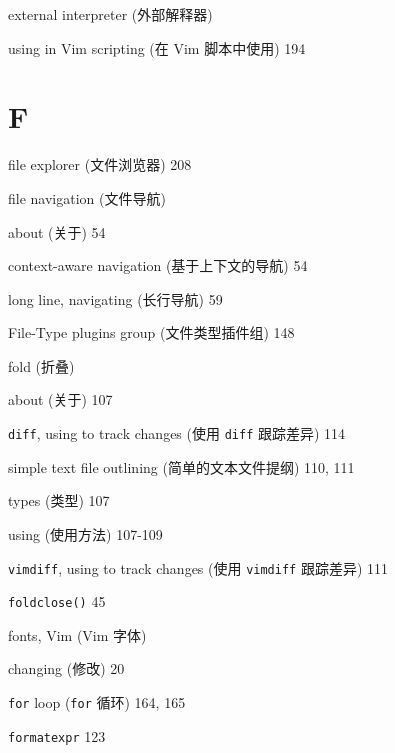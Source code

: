 \begin{multicols}{2}
\hangindent=3pc  external interpreter (外部解释器) \par
\hangindent=3pc \quad using in Vim scripting (在 Vim 脚本中使用) 194 \par

\hangindent=3pc  \section*{F}

\hangindent=3pc  file explorer (文件浏览器) 208

\hangindent=3pc  file navigation (文件导航) \par
\hangindent=3pc \quad about (关于) 54 \par
\hangindent=3pc \quad context-aware navigation (基于上下文的导航) 54 \par
\hangindent=3pc \quad long line, navigating (长行导航) 59 \par

\hangindent=3pc  File-Type plugins group (文件类型插件组) 148

\hangindent=3pc  fold (折叠) \par
\hangindent=3pc \quad about (关于) 107 \par
\hangindent=3pc \quad \texttt{diff}, using to track changes (使用 \texttt{diff} 跟踪差异) 114 \par
\hangindent=3pc \quad simple text file outlining (简单的文本文件提纲) 110, 111 \par
\hangindent=3pc \quad types (类型) 107 \par
\hangindent=3pc \quad using (使用方法) 107-109 \par
\hangindent=3pc \quad \texttt{vimdiff}, using to track changes (使用 \texttt{vimdiff} 跟踪差异) 111 \par

\hangindent=3pc  \texttt{foldclose()} 45

\hangindent=3pc  fonts, Vim (Vim 字体) \par
\hangindent=3pc \quad changing (修改) 20 \par

\hangindent=3pc  \texttt{for} loop (\texttt{for} 循环) 164, 165

\hangindent=3pc  \texttt{formatexpr} 123


\end{multicols}
